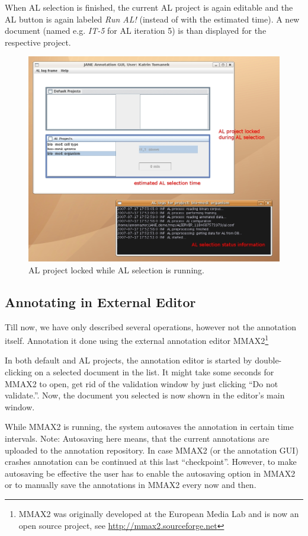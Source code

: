 \documentclass[DIV12,english,11pt,halfparskip]{scrartcl}
\begin{document}
When AL selection is finished, the current AL project is again
editable and the AL button is again labeled \emph{Run AL!} (instead of
with the estimated time). A new document (named e.g. \emph{IT-5}
for AL iteration 5) is than displayed for the respective project.

\begin{figure}[h]
  \centering
  \includegraphics[scale=0.5]{figs/ALSelection.jpg}
  \caption{AL project locked while AL selection is running.}
  \label{fig:alselection}
\end{figure}



\subsection{Annotating in External Editor}
Till now, we have only described several operations, however not the
annotation itself. Annotation it done using the external annotation
editor MMAX2\footnote{MMAX2 was originally developed at the European
  Media Lab and is now an open source project, see
  \url{http://mmax2.sourceforge.net}}

In both default and AL projects, the annotation editor is started by
double-clicking on a selected document in the list. It might take some
seconds for MMAX2 to open, get rid of the validation window by just
clicking ``Do not validate.''. Now, the document you selected is now
shown in the editor's main window. 

While MMAX2 is running, the system autosaves the annotation in certain
time intervals. Note: Autosaving here means, that the current
annotations are uploaded to the annotation repository. In case MMAX2
(or the annotation GUI) crashes annotation can be continued at this
last ``checkpoint''. However, to make autosaving be effective the user
has to enable the autosaving option in MMAX2 or to manually save the
annotations in MMAX2 every now and then.
\end{document}
